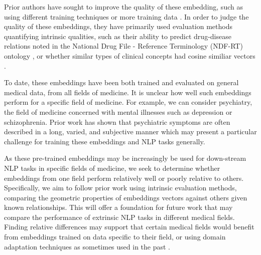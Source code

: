 \documentclass[11pt,a4paper]{article}
\begin{document}
Prior authors have sought to improve the quality of these embedding, such as using different training techniques or more training data \cite{beamClinicalConceptEmbeddings2018}. In order to judge the quality of these embeddings, they have primarily used evaluation methods quantifying intrinsic qualities, such as their ability to predict drug-disease relations noted in the National Drug File - Reference Terminology (NDF-RT) ontology \cite{minarro-gimenezExploringApplicationDeep2014}, or whether similar types of clinical concepts had cosine similiar vectors  \cite{choiLearningLowDimensionalRepresentations2016}.

To date, these embeddings have been both trained and evaluated on general medical data, from all fields of medicine. It is unclear how well such embeddings perform for a specific field of medicine. For example, we can consider psychiatry, the field of medicine concerned with mental illnesses such as depression or schizophrenia. Prior work has shown that psychiatric symptoms are often described in a long, varied, and subjective manner \cite{forbushSittingPinsNeedles2013} which may present a particular challenge for training these embeddings and NLP tasks generally.

As these pre-trained embeddings may be increasingly be used for down-stream NLP tasks in specific fields of medicine, we seek to determine whether embeddings from one field perform relatively well or poorly relative to others. Specifically, we aim to follow prior work using intrinsic evaluation methods, comparing the geometric properties of embeddings vectors against others given known relationships. This will offer a foundation for future work that may compare the performance of extrinsic NLP tasks in different medical fields. Finding relative differences may support that certain medical fields would benefit from embeddings trained on data specific to their field, or using domain adaptation techniques as sometimes used in the past \cite{yuRetrofittingConceptVector2017}. 
\end{document}
